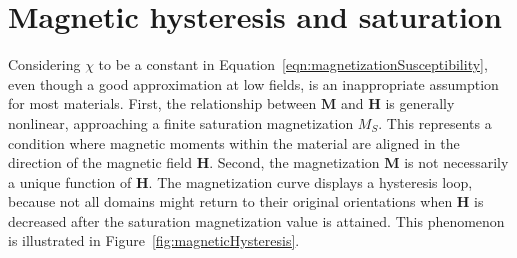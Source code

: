 

 
\section{Magnetic hysteresis and saturation}\label{sec:hysteresisAndSaturation}
Considering $\chi$ to be a constant in Equation~\ref{eqn:magnetizationSusceptibility}, even though a good approximation at low fields, is an inappropriate assumption for most materials. First, the relationship between $\mathbf{M}$ and $\mathbf{H}$ is generally nonlinear, approaching a finite saturation magnetization $M_{S}$. This represents a condition where magnetic moments within the material are aligned in the direction of the magnetic field $\mathbf{H}$. Second, the magnetization $\mathbf{M}$ is not necessarily a unique function of $\mathbf{H}$. The magnetization curve displays a hysteresis loop, because not all domains might return to their original orientations when $\mathbf{H}$ is decreased after the saturation magnetization value is attained. This phenomenon is illustrated in Figure~\ref{fig:magneticHysteresis}.

